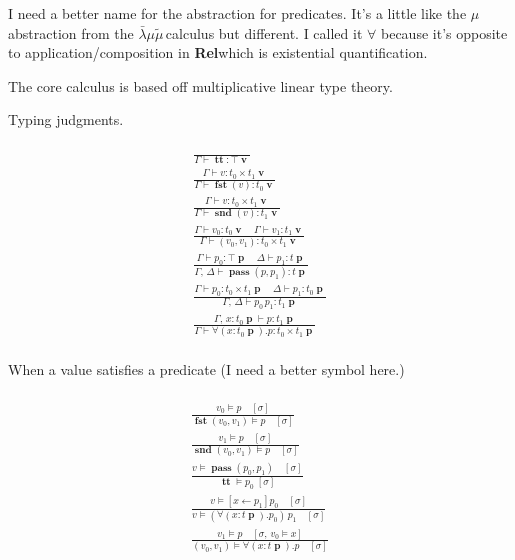 \documentclass[twocolumn]{scrartcl}
\newcommand{\Rel}{\textbf{Rel}}
\newcommand{\lk}{\(\bar{\lambda}\mu\tilde{\mu}\,\)}
\DeclareMathOperator{\val}{\textbf{v}}
\DeclareMathOperator{\prd}{\textbf{p}}
\DeclareMathOperator{\coin}{\textbf{tt}}
\DeclareMathOperator{\fst}{\textbf{fst}}
\DeclareMathOperator{\snd}{\textbf{snd}}
\DeclareMathOperator{\pass}{\textbf{pass}}
\DeclareMathOperator{\update}{\leftarrow}
\begin{document}
I need a better name for the abstraction for predicates. It's a little
like the \(\mu\) abstraction from the \lk calculus but different.  I
called it \(\forall\) because it's opposite to application/composition
in \Rel which is existential quantification.

The core calculus is based off multiplicative linear type theory.

Typing judgments.

\begin{multline*}
  \\
  \frac{
  }{
    \Gamma \vdash \coin \colon \top \val
  }\\
  \frac{
    \Gamma \vdash v \colon t_0 \times t_1 \val
  }{
    \Gamma \vdash \fst(v) \colon t_0 \val
  }\\
  \frac{
    \Gamma \vdash v \colon t_0 \times t_1 \val
  }{
    \Gamma \vdash \snd(v) \colon t_1 \val
  }\\
  \frac{
    \Gamma \vdash v_0 \colon t_0 \val \quad
    \Gamma \vdash v_1 \colon t_1 \val
  }{
    \Gamma \vdash ( v_0 , v_1 ) \colon t_0 \times t_1 \val
  }\\
  \frac{
    \Gamma \vdash p_0 \colon \top \prd \quad
    \Delta \vdash p_1 \colon t \prd
  }{
    \Gamma, \, \Delta \vdash \pass(p, p_1) \colon t \prd
  }\\
  \frac{
    \Gamma \vdash p_0 \colon t_0 \times t_1 \prd \quad
    \Delta \vdash p_1 \colon t_0 \prd
  }{
    \Gamma , \, \Delta \vdash p_0 \, p_1 \colon t_1 \prd
  }\\
  \frac{
    \Gamma , \, x \colon t_0 \prd \vdash p \colon t_1 \prd
  }{
    \Gamma \vdash \forall ( x \colon t_0 \prd ) . p \colon t_0 \times t_1 \prd
  }\\
\end{multline*}

When a value satisfies a predicate (I need a better symbol here.)

\begin{multline*}
  \\
\frac{
  v_0 \models p \quad [\sigma]
}{
  \fst ( v_0 , v_1 ) \models p \quad [\sigma]
}\\
\frac{
  v_1 \models p \quad [\sigma]
}{
  \snd ( v_0 , v_1 ) \models p \quad [\sigma]
}\\
\frac{
  v \models \pass(p_0, p_1) \quad [\sigma]
}{
  \coin \models p_0 \; [\sigma]
}\\
\frac{
  v \models [x \update p_1] p_0 \quad [\sigma]
}{
  v \models ( \forall (x \colon t \prd). p_0) \, p_1 \quad [\sigma]
}\\
\frac{
  v_1 \models p \quad [ \sigma , \, v_0 \models x]
}{
  ( v_0 , v_1 ) \models \forall (x \colon t \prd). p \quad [\sigma]
}\\
\end{multline*}
\end{document}
